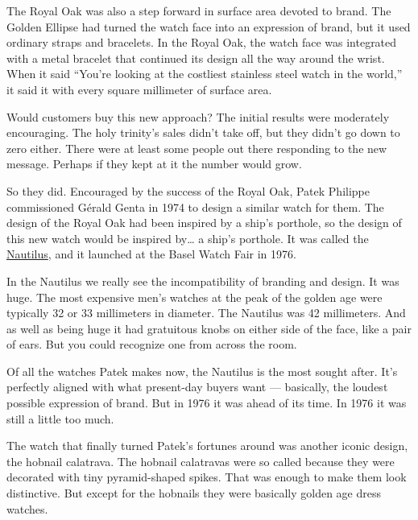 The Royal Oak was also a step forward in surface area devoted to brand.
The Golden Ellipse had turned the watch face into an expression of
brand, but it used ordinary straps and bracelets. In the Royal Oak, the
watch face was integrated with a metal bracelet that continued its
design all the way around the wrist. When it said ``You're looking at
the costliest stainless steel watch in the world,'' it said it with
every square millimeter of surface area.

Would customers buy this new approach? The initial results were
moderately encouraging. The holy trinity's sales didn't take off, but
they didn't go down to zero either. There were at least some people out
there responding to the new message. Perhaps if they kept at it the
number would grow.

So they did. Encouraged by the success of the Royal Oak, Patek Philippe
commissioned Gérald Genta in 1974 to design a similar watch for them.
The design of the Royal Oak had been inspired by a ship's porthole, so
the design of this new watch would be inspired by\ldots{} a ship's
porthole. It was called the
\href{https://www.sothebys.com/en/buy/auction/2025/important-watches-2/reference-3700-11-nautilus-jumbo-a-stainless-steel}{Nautilus},
and it launched at the Basel Watch Fair in 1976.

In the Nautilus we really see the incompatibility of branding and
design. It was huge. The most expensive men's watches at the peak of the
golden age were typically 32 or 33 millimeters in diameter. The Nautilus
was 42 millimeters. And as well as being huge it had gratuitous knobs on
either side of the face, like a pair of ears. But you could recognize
one from across the room.

Of all the watches Patek makes now, the Nautilus is the most sought
after. It's perfectly aligned with what present-day buyers want ---
basically, the loudest possible expression of brand. But in 1976 it was
ahead of its time. In 1976 it was still a little too much.

The watch that finally turned Patek's fortunes around was another iconic
design, the hobnail calatrava. The hobnail calatravas were so called
because they were decorated with tiny pyramid-shaped spikes. That was
enough to make them look distinctive. But except for the hobnails they
were basically golden age dress watches.

